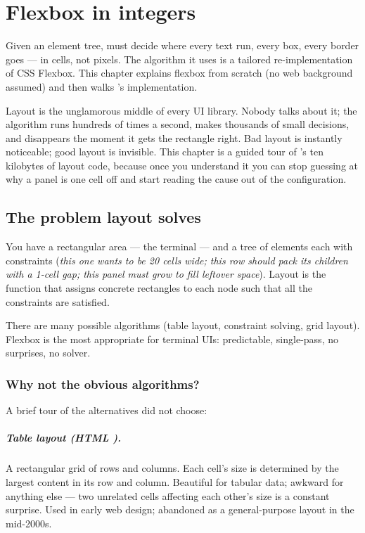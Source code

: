 \chapter{Flexbox in integers}
\label{ch:layout}

Given an element tree, \maya{} must decide where every text run, every
box, every border goes --- in cells, not pixels. The algorithm it uses
is a tailored re-implementation of CSS Flexbox. This chapter explains
flexbox from scratch (no web background assumed) and then walks
\maya{}'s implementation.

\begin{aside}
Layout is the unglamorous middle of every UI library. Nobody talks
about it; the algorithm runs hundreds of times a second, makes
thousands of small decisions, and disappears the moment it gets the
rectangle right. Bad layout is instantly noticeable; good layout is
invisible. This chapter is a guided tour of \maya{}'s ten kilobytes
of layout code, because once you understand it you can stop guessing
at why a panel is one cell off and start reading the cause out of
the configuration.
\end{aside}

\section{The problem layout solves}

You have a rectangular area --- the terminal --- and a tree of
elements each with constraints (\emph{this one wants to be 20 cells
wide; this row should pack its children with a 1-cell gap; this panel
must grow to fill leftover space}). Layout is the function that
assigns concrete  rectangles to each node such that
all the constraints are satisfied.

There are many possible algorithms (table layout, constraint solving,
grid layout). Flexbox is the most appropriate for terminal UIs:
predictable, single-pass, no surprises, no solver.

\subsection{Why not the obvious algorithms?}

A brief tour of the alternatives \maya{} did not choose:

\paragraph{Table layout (HTML ).} A rectangular grid
of rows and columns. Each cell's size is determined by the largest
content in its row and column. Beautiful for tabular data; awkward
for anything else --- two unrelated cells affecting each other's
size is a constant surprise. Used in early web design; abandoned
as a general-purpose layout in the mid-2000s.

